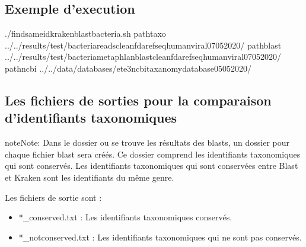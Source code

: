 \documentclass[letterpaper,10pt,french]{sphinxmanual}
\begin{document}
\subsection{Exemple d’execution}
\label{\detokenize{bash/find_same_id_kraken_blast_bacteria.sh:exemple-d-execution}}
\begin{sphinxVerbatim}[commandchars=\\\{\}]
./find\PYGZus{}same\PYGZus{}id\PYGZus{}kraken\PYGZus{}blast\PYGZus{}bacteria.sh 
\PYGZhy{}path\PYGZus{}taxo ../../results/test/bacteria\PYGZus{}reads\PYGZus{}clean\PYGZus{}fda\PYGZus{}refseq\PYGZus{}human\PYGZus{}viral\PYGZus{}07\PYGZus{}05\PYGZus{}2020/ 
\PYGZhy{}path\PYGZus{}blast ../../results/test/bacteria\PYGZus{}metaphlan\PYGZus{}blast\PYGZus{}clean\PYGZus{}fda\PYGZus{}refseq\PYGZus{}human\PYGZus{}viral\PYGZus{}07\PYGZus{}05\PYGZus{}2020/ 
\PYGZhy{}path\PYGZus{}ncbi ../../data/databases/ete3\PYGZus{}ncbi\PYGZus{}taxanomy\PYGZus{}database\PYGZus{}05\PYGZus{}05\PYGZus{}2020/
\end{sphinxVerbatim}


\subsection{Les fichiers de sorties pour la comparaison d’identifiants taxonomiques}
\label{\detokenize{bash/find_same_id_kraken_blast_bacteria.sh:les-fichiers-de-sorties-pour-la-comparaison-d-identifiants-taxonomiques}}
\begin{sphinxadmonition}{note}{Note:}
Dans le dossier ou se trouve les résultats des blasts, un dossier pour chaque fichier blast sera créés. Ce dossier comprend les identifiants taxonomiques qui sont conservés. Les identifiants taxonomiques qui sont conservées entre Blast et Kraken sont les identifiants du même genre.
\end{sphinxadmonition}

Les fichiers de sortie sont :
\begin{itemize}
\item {} 
*\_conserved.txt : Les identifiants taxonomiques conservés.

\item {} 
*\_notconserved.txt : Les identifiants taxonomiques qui ne sont pas conservés.

\end{itemize}
\end{document}
